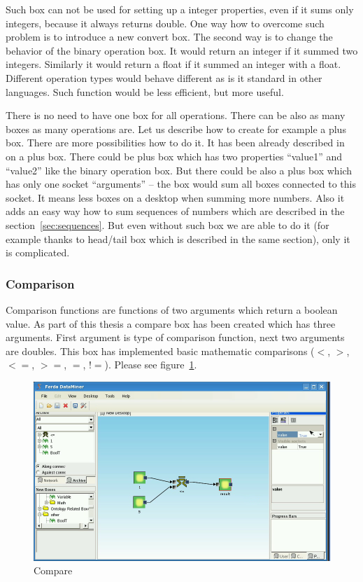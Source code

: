 \documentclass[a4paper,12pt]{book}
\begin{document}
Such box can not be used for setting up a integer properties, even if it sums only integers, because it always returns double. One way how to overcome such problem is to introduce a new convert box. The second way is to change the behavior of the binary operation box. It would return an integer if it summed two integers. Similarly it would return a float if it summed an integer with a float. Different operation types would behave different as is it standard in other languages. Such function would be less efficient, but more useful.  

There is no need to have one box for all operations. There can be also as many boxes as many operations are. Let us describe how to create for example a plus box. There are more possibilities how to do it. It has been already described in~\cite{znalosti2006} on a plus box. There could be plus box which has two properties ``value1'' and ``value2'' like the binary operation box. But there could be also a plus box which has only one socket ``arguments'' -- the box would sum all boxes connected to this socket. It means less boxes on a desktop when summing more numbers. Also it adds an easy way how to sum sequences of numbers which are described in the section~\ref{sec:sequences}. But even without such box we are able to do it (for example thanks to head/tail box which is described in the same section), only it is complicated.    

\subsubsection{Comparison}
Comparison functions are functions of two arguments which return a boolean value. As part of this thesis a compare box has been created which has three arguments. First argument is type of comparison function, next two arguments are doubles. This box has implemented basic mathematic comparisons ($<$, $>$, $<=$, $>=$, $=$, $!=$). Please see figure~\ref{fig:boxCompare}.
\begin{figure}
	\includegraphics[width=1\textwidth]{compare2.png}
	\caption{Compare}
	\label{fig:boxCompare}
\end{figure}
\end{document}
